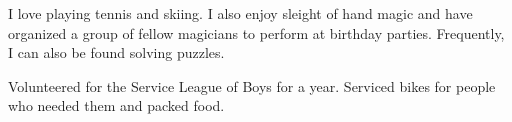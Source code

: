 \documentclass[9pt]{developercv} %
\begin{document}
\vspace{0.4cm}
\begin{minipage}[t]{0.6\textwidth}
	\vspace{-\baselineskip} %
	
	I love playing tennis and skiing. I also enjoy sleight of hand magic and have organized a group of fellow magicians to perform at birthday parties.
	Frequently, I can also be found solving puzzles. 
\end{minipage}
\hfill
\begin{minipage}[t]{0.35\textwidth}
	\vspace{-\baselineskip} %
	
	Volunteered for the Service League of Boys for a year. Serviced bikes for people who needed them and packed food. 
\end{minipage}

\end{document}
